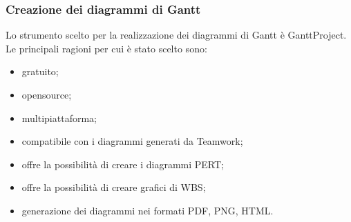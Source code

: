 \documentclass[../NormeProgetto.tex]{subfiles}
\begin{document}
			\subsubsection{Creazione dei diagrammi di Gantt}
			Lo strumento scelto per la realizzazione dei diagrammi di Gantt è GanttProject. Le principali ragioni per cui è stato scelto sono:
			\begin{itemize}
				\item gratuito;
				\item opensource;
				\item multipiattaforma;
				\item compatibile con i diagrammi generati da Teamwork;
				\item offre la possibilità di creare i diagrammi PERT;
				\item offre la possibilità di creare grafici di WBS;
				\item generazione dei diagrammi nei formati PDF, PNG, HTML.
			\end{itemize}
\end{document}
